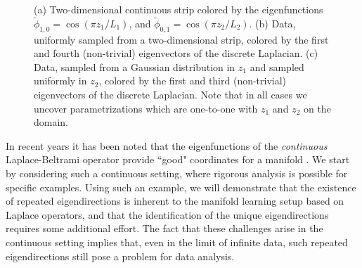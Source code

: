 \documentclass[3p]{elsarticle}
\begin{document}
\begin{figure}[t]
\begin{subfigure}{0.3\textwidth}
\caption{}
\label{subfig:strip_evecs_nonuniform}
\end{subfigure}
%
\caption{(a) Two-dimensional continuous strip colored by the eigenfunctions $\tilde{\phi}_{1, 0} = \cos \left( {\pi z_1}/{L_1} \right)$, and $\tilde{\phi}_{0, 1} = \cos \left( {\pi z_2}/{L_2} \right)$. (b) Data, uniformly sampled from a two-dimensional strip, colored by the first and fourth (non-trivial) eigenvectors of the discrete Laplacian. (c) Data, sampled from a Gaussian distribution in $z_1$ and sampled uniformly in $z_2$, colored by the first and third (non-trivial) eigenvectors of the discrete Laplacian. Note that in all cases we uncover parametrizations which are one-to-one with $z_1$ and $z_2$ on the domain.}
\end{figure}

In recent years it has been noted that the eigenfunctions of the \emph{continuous}
Laplace-Beltrami operator provide ``good" coordinates for a manifold \cite{jones2008}.
%
We start by considering such a continuous setting, where rigorous analysis is possible for specific examples.
%
Using such an example, we will demonstrate that the existence of repeated eigendirections is
inherent to the manifold learning setup based on Laplace operators,
and that the identification of the unique eigendirections requires some additional effort.
%
The fact that these challenges arise in the continuous setting implies that, even in the limit of infinite data, such repeated eigendirections still pose a problem for data analysis.
\end{document}
